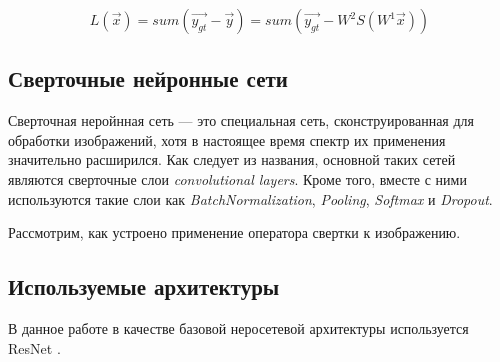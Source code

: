 \begin{equation}\label{eq:loss}
	   L(\vec{x}) = sum(\vec{y_{gt}} - \vec{y}) = sum(\vec{y_{gt}} - W^{2} S(W^{1} \vec{x}))
\end{equation}

 
 
\subsection{Сверточные нейронные сети}
\indent
\indent
Сверточная неройнная сеть --- это специальная сеть, сконструированная для 
обработки изображений, хотя в настоящее время спектр их применения 
значительно расширился. Как следует из названия, основной таких сетей 
являются сверточные слои \textit{convolutional layers}. 
Кроме того, вместе с ними используются такие
слои как \textit{BatchNormalization}, \textit{Pooling}, \textit{Softmax} и \textit{Dropout}.

\indent
\indent
Рассмотрим, как устроено применение оператора свертки к изображению.

\subsection{Используемые архитектуры}
В данное работе в качестве базовой неросетевой архитектуры используется
ResNet \cite{resnet}.

